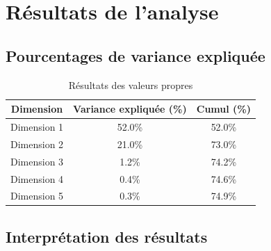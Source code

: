 \documentclass[12pt,a4paper]{book}
\begin{document}
	\begin{center}
	\end{center}
	
	\section{Résultats de l'analyse}
	
	\subsection{Pourcentages de variance expliquée}
	
	\begin{table}[H]
		\centering
		\caption{Résultats des valeurs propres}
		\begin{tabular}{ccc}
			\toprule
			\textbf{Dimension} & \textbf{Variance expliquée (\%)} & \textbf{Cumul (\%)} \\
			\midrule
			Dimension 1 & 52.0\% & 52.0\% \\
			Dimension 2 & 21.0\% & 73.0\% \\
			Dimension 3 & 1.2\% & 74.2\% \\
			Dimension 4 & 0.4\% & 74.6\% \\
			Dimension 5 & 0.3\% & 74.9\% \\
			\bottomrule
		\end{tabular}
	\end{table}
	
	\subsection{Interprétation des résultats}
	
\end{document}
